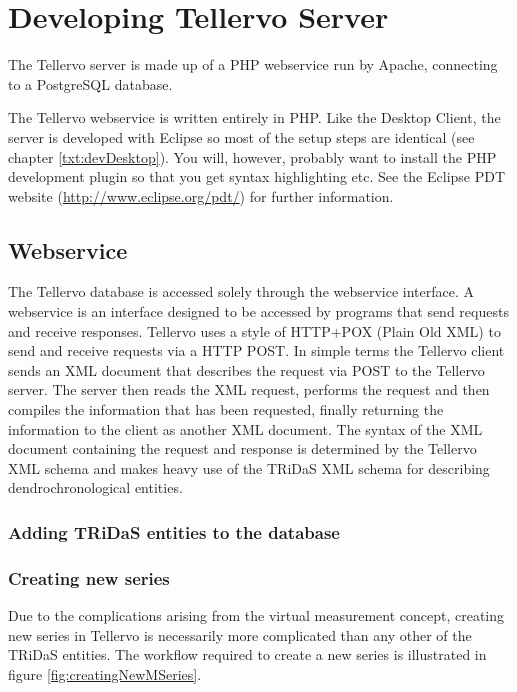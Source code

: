 \chapter{Developing Tellervo Server}

The Tellervo server is made up of a PHP webservice run by Apache, connecting to a PostgreSQL database.  

The Tellervo webservice is written entirely in PHP.  Like the Desktop Client, the server is developed with Eclipse so most of the setup steps are identical (see chapter \ref{txt:devDesktop}).  You will, however, probably want to install the PHP development plugin so that you get syntax highlighting etc.  See the Eclipse PDT website (\url{http://www.eclipse.org/pdt/}) for further information.


\section{Webservice }

The Tellervo database is accessed solely through the webservice interface.  A webservice is an interface designed to be accessed by programs that send requests and receive responses.  Tellervo uses a style of HTTP+POX (Plain Old XML) to send and receive requests via a HTTP POST.  In simple terms the Tellervo client sends an XML document that describes the request via POST to the Tellervo server.  The server then reads the XML request, performs the request and then compiles the information that has been requested, finally returning the information to the client as another XML document.  The syntax of the XML document containing the request and response is determined by the Tellervo XML schema and makes heavy use of the TRiDaS XML schema for describing dendrochronological entities.


\subsection{Adding TRiDaS entities to the database}

\subsection{Creating new series}

Due to the complications arising from the virtual measurement concept, creating new series in Tellervo is necessarily more complicated than any other of the TRiDaS entities.  The workflow required to create a new series is illustrated in figure \ref{fig:creatingNewMSeries}.

